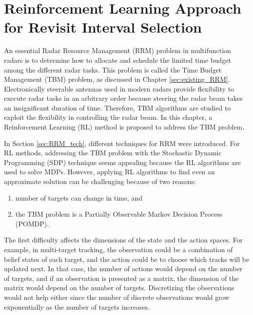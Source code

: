 \documentclass[english, 12pt, a4paper, elec, utf8, a-1b, online]{aaltothesis}
\numberwithin{equation}{section}
\begin{document}
\newpage
\section{Reinforcement Learning Approach for Revisit Interval Selection}\label{sec:rl_ri}

An essential Radar Resource Management (RRM) problem in multifunction radars is to determine how to allocate and schedule the limited time budget among the different radar tasks. 
This problem is called the Time Budget Management (TBM) problem, as discussed in Chapter \ref{sec:existing_RRM}.
Electronically steerable antennas used in modern radars provide flexibility to execute radar tasks in an arbitrary order because steering the radar beam takes an insignificant duration of time. 
Therefore, TBM algorithms are studied to exploit the flexibility in controlling the radar beam.
In this chapter, a Reinforcement Learning (RL) method is proposed to address the TBM problem.

In Section \ref{sec:RRM_tech}, different techniques for RRM were introduced.
For RL methods, addressing the TBM problem with the Stochastic Dynamic Programming (SDP) technique seems appealing because the RL algorithms are used to solve MDPs.
However, applying RL algorithms to find even an approximate solution can be challenging because of two reasons:
\begin{enumerate}
    \item number of targets can change in time, and
    \item the TBM problem is a Partially Observable Markov Decision Process (POMDP).
\end{enumerate}
The first difficulty affects the dimensions of the state and the action spaces. 
For example, in multi-target tracking, the observation could be a combination of belief states of each target, and the action could be to choose which tracks will be updated next.
In that case, the number of actions would depend on the number of targets, and if an observation is presented as a matrix, the dimension of the matrix would depend on the number of targets.
Discretizing the observations would not help either since the number of discrete observations would grow exponentially as the number of targets increases.
\end{document}
